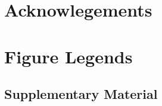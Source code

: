 \begin{bibunit}[naturemag]

% 
{\bf

}









\section{Acknowlegements}

{\footnotesize
% 
% 
}


\pagebreak
\FloatBarrier
\section{Figure Legends}

\end{bibunit}

\pagebreak
\FloatBarrier

\begin{bibunit}[naturemag]

\beginsupplement
\setcounter{secnumdepth}{4}
\section{Supplementary Material}



{\footnotesize
% 
% 
}
\pagebreak


\pagebreak

% 

\pagebreak


% 
% 
\end{bibunit}


